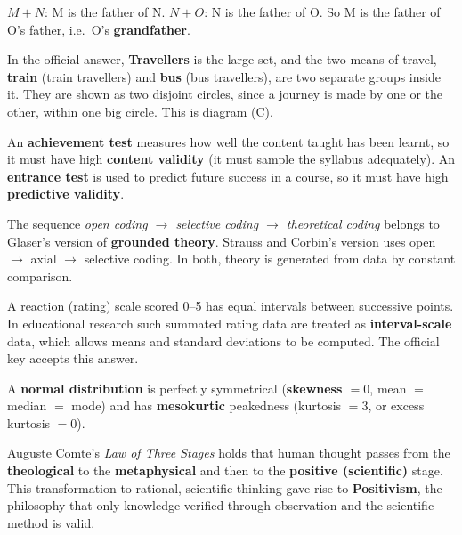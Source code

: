 $M+N$: M is the father of N. $N+O$: N is the father of O. So M is the father of O's father, i.e.\ O's \textbf{grandfather}.


In the official answer, \textbf{Travellers} is the large set, and the two means of travel, \textbf{train} (train travellers) and \textbf{bus} (bus travellers), are two separate groups inside it. They are shown as two disjoint circles, since a journey is made by one or the other, within one big circle. This is diagram (C).
\begin{center}
\end{center}

An \textbf{achievement test} measures how well the content taught has been learnt, so it must have high \textbf{content validity} (it must sample the syllabus adequately). An \textbf{entrance test} is used to predict future success in a course, so it must have high \textbf{predictive validity}.

The sequence \emph{open coding $\rightarrow$ selective coding $\rightarrow$ theoretical coding} belongs to Glaser's version of \textbf{grounded theory}. Strauss and Corbin's version uses open $\rightarrow$ axial $\rightarrow$ selective coding. In both, theory is generated from data by constant comparison.

A reaction (rating) scale scored 0--5 has equal intervals between successive points. In educational research such summated rating data are treated as \textbf{interval-scale} data, which allows means and standard deviations to be computed. The official key accepts this answer.

A \textbf{normal distribution} is perfectly symmetrical (\textbf{skewness $=0$}, mean $=$ median $=$ mode) and has \textbf{mesokurtic} peakedness (kurtosis $=3$, or excess kurtosis $=0$).

Auguste Comte's \emph{Law of Three Stages} holds that human thought passes from the \textbf{theological} to the \textbf{metaphysical} and then to the \textbf{positive (scientific)} stage. This transformation to rational, scientific thinking gave rise to \textbf{Positivism}, the philosophy that only knowledge verified through observation and the scientific method is valid.
